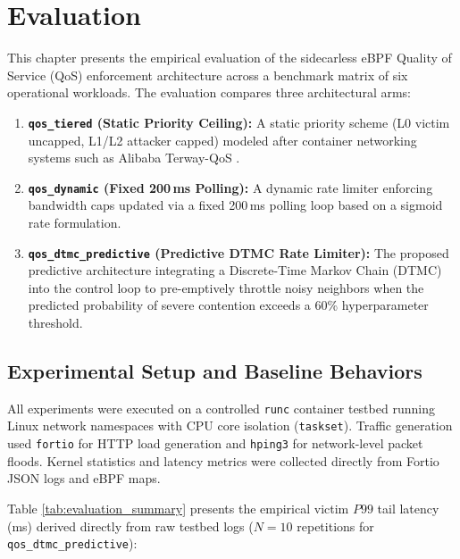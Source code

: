 
\section{Evaluation}

This chapter presents the empirical evaluation of the sidecarless eBPF Quality of Service (QoS) enforcement architecture across a benchmark matrix of six operational workloads. The evaluation compares three architectural arms:
\begin{enumerate}
    \item \textbf{\texttt{qos\_tiered} (Static Priority Ceiling):} A static priority scheme (L0 victim uncapped, L1/L2 attacker capped) modeled after container networking systems such as Alibaba Terway-QoS \cite{aliyun2024terway}.
    \item \textbf{\texttt{qos\_dynamic} (Fixed 200\,ms Polling):} A dynamic rate limiter enforcing bandwidth caps updated via a fixed 200\,ms polling loop based on a sigmoid rate formulation.
    \item \textbf{\texttt{qos\_dtmc\_predictive} (Predictive DTMC Rate Limiter):} The proposed predictive architecture integrating a Discrete-Time Markov Chain (DTMC) into the control loop to pre-emptively throttle noisy neighbors when the predicted probability of severe contention exceeds a 60\% hyperparameter threshold.
\end{enumerate}

\subsection{Experimental Setup and Baseline Behaviors}
All experiments were executed on a controlled \texttt{runc} container testbed running Linux network namespaces with CPU core isolation (\texttt{taskset}). Traffic generation used \texttt{fortio} for HTTP load generation and \texttt{hping3} for network-level packet floods. Kernel statistics and latency metrics were collected directly from Fortio JSON logs and eBPF maps.

Table \ref{tab:evaluation_summary} presents the empirical victim $P99$ tail latency (ms) derived directly from raw testbed logs ($N=10$ repetitions for \texttt{qos\_dtmc\_predictive}):

